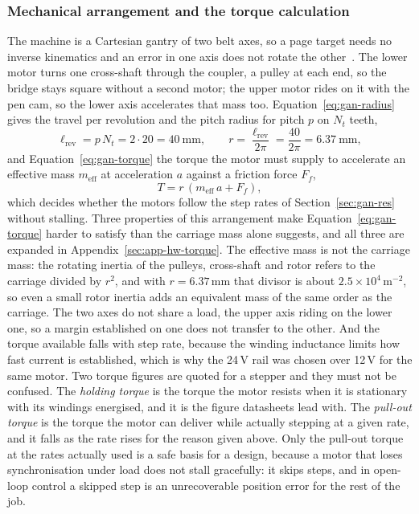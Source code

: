 
\subsubsection{Mechanical arrangement and the torque calculation}
\label{sec:gan-mech}

The machine is a Cartesian gantry of two belt axes, so a page target needs no inverse kinematics and an error in one axis does not rotate the other~\cite{teikari2016}. The lower motor turns one cross-shaft through the coupler, a pulley at each end, so the bridge stays square without a second motor; the upper motor rides on it with the pen cam, so the lower axis accelerates that mass too. Equation~\ref{eq:gan-radius} gives the travel per revolution and the pitch radius for pitch $p$ on $N_t$ teeth,
\begin{equation}
\ell_{\mathrm{rev}}=p\,N_t=2\cdot20=40\ \mathrm{mm},\qquad r=\frac{\ell_{\mathrm{rev}}}{2\pi}=\frac{40}{2\pi}=6.37\ \mathrm{mm},
\label{eq:gan-radius}
\end{equation}
and Equation~\ref{eq:gan-torque} the torque the motor must supply to accelerate an effective mass $m_{\mathrm{eff}}$ at acceleration $a$ against a friction force $F_f$,
\begin{equation}
T=r\,(m_{\mathrm{eff}}\,a+F_f),
\label{eq:gan-torque}
\end{equation}
which decides whether the motors follow the step rates of Section~\ref{sec:gan-res} without stalling.
Three properties of this arrangement make Equation~\ref{eq:gan-torque} harder to satisfy than the carriage mass alone suggests, and all three are expanded in Appendix~\ref{sec:app-hw-torque}.
The effective mass is not the carriage mass: the rotating inertia of the pulleys, cross-shaft and rotor refers to the carriage divided by $r^2$, and with $r=6.37$\,mm that divisor is about $2.5\times10^4$\,m$^{-2}$, so even a small rotor inertia adds an equivalent mass of the same order as the carriage.
The two axes do not share a load, the upper axis riding on the lower one, so a margin established on one does not transfer to the other.
And the torque available falls with step rate, because the winding inductance limits how fast current is established, which is why the 24\,V rail was chosen over 12\,V for the same motor.
Two torque figures are quoted for a stepper and they must not be confused. The \emph{holding torque} is the torque the motor resists when it is stationary with its windings energised, and it is the figure datasheets lead with. The \emph{pull-out torque} is the torque the motor can deliver while actually stepping at a given rate, and it falls as the rate rises for the reason given above. Only the pull-out torque at the rates actually used is a safe basis for a design, because a motor that loses synchronisation under load does not stall gracefully: it skips steps, and in open-loop control a skipped step is an unrecoverable position error for the rest of the job.


